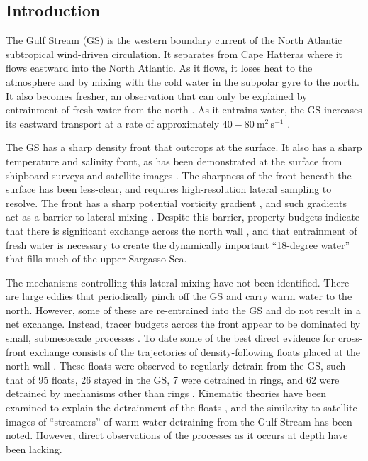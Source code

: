 \documentclass[draft,grl]{agutex2015}
\begin{document}
\begin{article}

%
%

\section{Introduction}

The Gulf Stream (GS) is the western boundary current of the North Atlantic subtropical wind-driven circulation.  It separates from Cape Hatteras where it flows eastward into the North Atlantic.  As it flows, it loses heat to  the atmosphere and by mixing with the cold water in the subpolar gyre to the north.  It also becomes fresher, an observation that can only be explained by entrainment of fresh water from the north \citep{joyceetal13}.  As it entrains water, the GS  increases its eastward transport at a rate of approximately $40-80\ \mathrm{m^2\,s^{-1}}$ \citep[or 4-8 Sv/100 km][]{johnsetal95}.   

The GS has a sharp density front that outcrops at the surface. It also has a sharp temperature and salinity front, as has been demonstrated at the surface from shipboard surveys \citep{fordetal52} and satellite images \citep{churchilletal89}. The sharpness of the front beneath the surface has been less-clear, and requires high-resolution lateral sampling to resolve. The front has a sharp potential vorticity gradient \citep{rajamonyetal01}, and such gradients act as a barrier to lateral mixing \citep{marshalletal06,naveiraetal11}.  Despite this  barrier, property budgets indicate that there is significant exchange across the north wall \citep{joyceetal13}, and that entrainment of fresh water is necessary to create the dynamically important ``18-degree water'' that fills much of the upper Sargasso Sea. 

The mechanisms controlling this lateral mixing have not been identified. There are large eddies that periodically pinch off the GS and carry warm water to the north. However, some of these are re-entrained into the GS and do not result in a net exchange. Instead, tracer budgets across the front appear to be dominated by small, submesoscale processes \citep{boweretal85}. To date some of the best direct evidence for cross-front exchange consists of the trajectories of density-following floats placed at the north wall \citep{bowerrossby89,bowerlozier94}.  These floats were observed to regularly detrain from the GS, such that of 95 floats, 26 stayed in the GS, 7 were detrained in rings, and 62 were detrained by mechanisms other than rings \citep{bowerlozier94}.  Kinematic theories have been examined to explain the detrainment of the floats \citep{flierletal87,stern85,prattetal95}, and the similarity to satellite images of ``streamers'' of warm water detraining from the Gulf Stream has been noted.  However, direct observations of the  processes as it occurs at depth have been lacking.  


\end{article}
\end{document}
